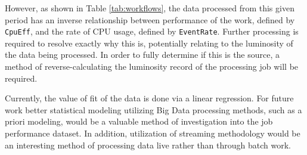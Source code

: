 \documentclass[print,ms]{nuthesis}
\begin{document}
However, as shown in Table \ref{tab:workflows}, the data processed from this given period has an inverse relationship between performance of the work, defined by \texttt{CpuEff}, and the rate of CPU usage, defined by \texttt{EventRate}. Further processing is required to resolve exactly why this is, potentially relating to the luminosity\cite{lumi} of the data being processed. In order to fully determine if this is the source, a method of reverse-calculating the luminosity record of the processing job will be required.

Currently, the value of fit of the data is done via a linear regression. For future work better statistical modeling utilizing Big Data processing methods, such as a priori modeling, would be a valuable method of investigation into the job performance dataset. In addition, utilization of streaming methodology would be an interesting method of processing data live rather than through batch work.




\backmatter



\end{document}

